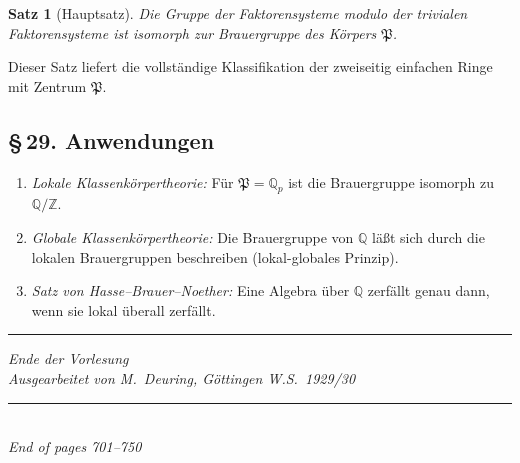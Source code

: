 \documentclass[10pt,a4paper]{article}
\theoremstyle{plain}
\newtheorem{satz}{Satz}[section]
\theoremstyle{definition}
\theoremstyle{remark}
\newcommand{\ZZ}{\mathbb{Z}}
\newcommand{\QQ}{\mathbb{Q}}
\begin{document}
\begin{satz}[Hauptsatz]
Die Gruppe der Faktorensysteme modulo der trivialen Faktorensysteme ist isomorph zur Brauergruppe des K\"orpers $\mathfrak{P}$.
\end{satz}

Dieser Satz liefert die vollst\"andige Klassifikation der zweiseitig einfachen Ringe mit Zentrum $\mathfrak{P}$.

\subsection*{\S\,29. Anwendungen}

\begin{enumerate}
\item \textit{Lokale Klassenk\"orpertheorie:} F\"ur $\mathfrak{P} = \QQ_p$ ist die Brauergruppe isomorph zu $\QQ/\ZZ$.

\item \textit{Globale Klassenk\"orpertheorie:} Die Brauergruppe von $\QQ$ l\"a\ss t sich durch die lokalen Brauergruppen beschreiben (lokal-globales Prinzip).

\item \textit{Satz von Hasse--Brauer--Noether:} Eine Algebra \"uber $\QQ$ zerf\"allt genau dann, wenn sie lokal \"uberall zerf\"allt.
\end{enumerate}

\bigskip
\noindent\rule{\textwidth}{0.4pt}
\begin{center}
\textit{Ende der Vorlesung\\[0.3em]
Ausgearbeitet von M.\ Deuring, G\"ottingen W.S.\ 1929/30}
\end{center}

\vfill
\begin{center}
\rule{0.5\textwidth}{0.4pt}\\[0.5em]
{\small\textit{End of pages 701--750}}
\end{center}
\end{document}
